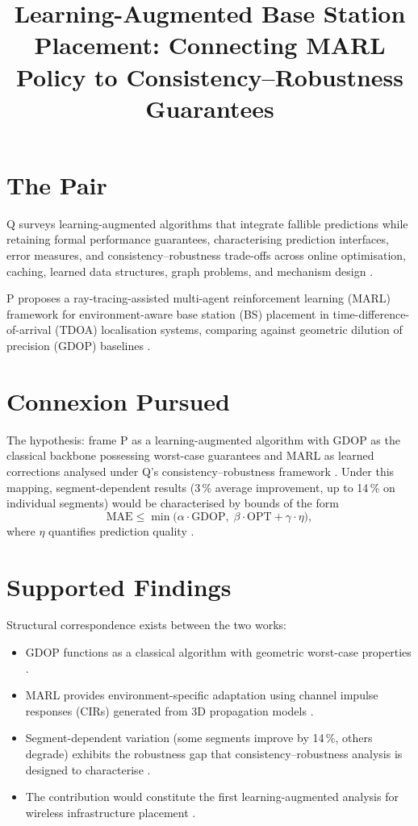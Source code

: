 \documentclass{article}
\title{Learning-Augmented Base Station Placement: Connecting MARL Policy to Consistency--Robustness Guarantees}
\begin{document}
\maketitle

\section*{The Pair}

Q surveys learning-augmented algorithms that integrate fallible predictions while retaining formal performance guarantees, characterising prediction interfaces, error measures, and consistency--robustness trade-offs across online optimisation, caching, learned data structures, graph problems, and mechanism design .

P proposes a ray-tracing-assisted multi-agent reinforcement learning (MARL) framework for environment-aware base station (BS) placement in time-difference-of-arrival (TDOA) localisation systems, comparing against geometric dilution of precision (GDOP) baselines .

\section*{Connexion Pursued}

The hypothesis: frame P as a learning-augmented algorithm with GDOP as the classical backbone possessing worst-case guarantees and MARL as learned corrections analysed under Q's consistency--robustness framework . Under this mapping, segment-dependent results (3\,\% average improvement, up to 14\,\% on individual segments) would be characterised by bounds of the form
\[
  \mathrm{MAE} \leq \min\bigl(\alpha \cdot \mathrm{GDOP},\; \beta \cdot \mathrm{OPT} + \gamma \cdot \eta\bigr),
\]
where \(\eta\) quantifies prediction quality .

\section*{Supported Findings}

Structural correspondence exists between the two works:

\begin{itemize}
  \item GDOP functions as a classical algorithm with geometric worst-case properties .
  \item MARL provides environment-specific adaptation using channel impulse responses (CIRs) generated from 3D propagation models .
  \item Segment-dependent variation (some segments improve by 14\,\%, others degrade) exhibits the robustness gap that consistency--robustness analysis is designed to characterise .
  \item The contribution would constitute the first learning-augmented analysis for wireless infrastructure placement .
\end{itemize}
\end{document}
